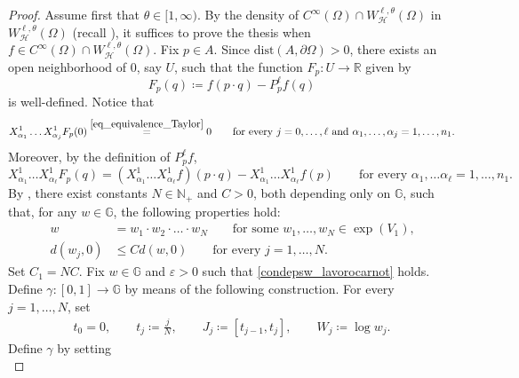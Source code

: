 \documentclass[11pt]{amsart}
\newcommand{\hhh}{{\mathcal{H}}}
\newcommand{\rr}{\mathbb R}
\newcommand{\Om}{\Omega}
\newcommand{\eps}{\varepsilon}
\theoremstyle{plain}
\theoremstyle{definition}
\theoremstyle{remark}
\numberwithin{equation}{section}
\begin{document}
\begin{proof}
Assume first that $\theta\in[1,\infty)$. By the density of $C^\infty(\Om)\cap W^{\ell,\theta}_\hhh(\Om)$ in $W^{\ell,\theta}_\hhh(\Om)$ (recall ), it suffices to prove the thesis when $f\in C^\infty(\Om)\cap W^{\ell,\theta}_\hhh(\Om)$. Fix $p\in A$. 
    Since $\mathrm{dist}(A,\partial\Om)>0$, there exists an open neighborhood of $0$, say $U$, such that the function $F_p:U\to \rr$ given by 
    \begin{equation*}
        F_p(q)\coloneqq f(p\cdot q)-P^\ell_p f(q)
    \end{equation*}
    is well-defined. Notice that
    \begin{equation} \label{derivatesonozeronellidentitaF}
    X^1_{\alpha_1}\ldots X^1_{\alpha_j}F_p(0) \overset{\eqref{eq_equivalence_Taylor}}{=}0\qquad\text{for every $j=0,\ldots,\ell$ and $\alpha_1,\ldots,\alpha_j=1,\ldots, n_1$.}
    \end{equation}
    Moreover, by the definition of $P^\ell_p f$,
    \begin{equation} \label{derivatediFallultimostep}
        X^1_{\alpha_1}\ldots X^1_{\alpha_\ell}F_p(q)=\left(X^1_{\alpha_1}\ldots X^1_{\alpha_\ell}f\right)(p\cdot q)-X^1_{\alpha_1}\ldots X^1_{\alpha_\ell}f(p)\qquad\text{for every $\alpha_1,\ldots \alpha_\ell=1,\ldots, n_1$}.
    \end{equation}
 By \cite[Lemma 1.40]{MR0657581}, there exist constants $N\in\mathbb N_+$ and $C>0$, both depending only on $\mathbb G$, such that, for any $w\in\mathbb G$, the following properties hold:
    \begin{align}
        w&=w_1\cdot w_2 \cdot \ldots \cdot w_N\qquad\text{for some $w_1,\ldots,w_N\in \exp(V_1)$,}\nonumber\\
        d(w_j,0)&\leq C d(w,0)\qquad\text{for every $j=1,\ldots,N$.}\label{boundsupezziorizzontali373737373}
    \end{align}
    Set $C_1=N C$. Fix $w\in\mathbb G$ and $\eps>0$ such that \eqref{condepsw_lavorocarnot} holds. Define $\gamma:[0,1]\to \mathbb G$ by means of the following construction. For every $j=1,\ldots, N$, set
    \begin{align*}
        t_0=0,\qquad t_j\coloneqq \frac{j}{N},\qquad 
        J_j\coloneqq \left[t_{j-1},t_j\right],\qquad W_j\coloneqq \log w_j.
    \end{align*}
    Define $\gamma$ by setting
    \begin{equation*}

\end{equation*}
\end{proof}
\end{document}
